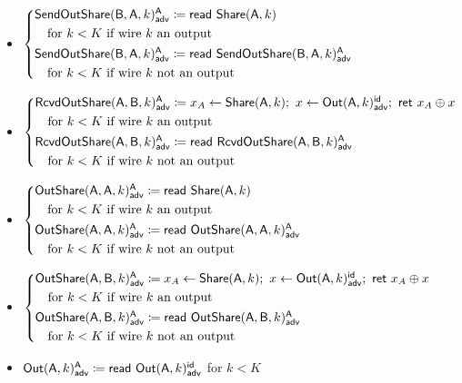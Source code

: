 \begin{itemize}
\item {\color{blue} $\begin{cases*} \LeakSendOutShare(\B,\A,k)^\A_\adv \coloneqq \read{\Share(\A,k)} \\ \hspace{10pt} \text{for $k < K$ if wire $k$ an output} \\ \LeakSendOutShare(\B,\A,k)^\A_\adv \coloneqq \read{\LeakSendOutShare(\B,\A,k)^\A_\adv} \\ \hspace{10pt} \text{for $k < K$ if wire $k$ not an output} \end{cases*}$}
\item {\color{blue} $\begin{cases*} \LeakRcvdOutShare(\A,\B,k)^\A_\adv \coloneqq x_A \leftarrow \Share(\A,k); \ x \leftarrow \LeakOut(\A,k)^\id_\adv; \ \ret{x_A \oplus x} \\ \hspace{10pt} \text{for $k < K$ if wire $k$ an output} \\ \LeakRcvdOutShare(\A,\B,k)^\A_\adv \coloneqq \read{\LeakRcvdOutShare(\A,\B,k)^\A_\adv} \\ \hspace{10pt} \text{for $k < K$ if wire $k$ not an output} \end{cases*}$}
\item {\color{blue} $\begin{cases*} \LeakOutShare(\A,\A,k)^\A_\adv \coloneqq \read{\Share(\A,k)} \\ \hspace{10pt} \text{for $k < K$ if wire $k$ an output} \\ \LeakOutShare(\A,\A,k)^\A_\adv \coloneqq \read{\LeakOutShare(\A,\A,k)^\A_\adv} \\ \hspace{10pt} \text{for $k < K$ if wire $k$ not an output} \end{cases*}$}
\item {\color{blue} $\begin{cases*} \LeakOutShare(\A,\B,k)^\A_\adv \coloneqq x_A \leftarrow \Share(\A,k); \ x \leftarrow \LeakOut(\A,k)^\id_\adv; \ \ret{x_A \oplus x} \\ \hspace{10pt} \text{for $k < K$ if wire $k$ an output} \\ \LeakOutShare(\A,\B,k)^\A_\adv \coloneqq \read{\LeakOutShare(\A,\B,k)^\A_\adv} \\ \hspace{10pt} \text{for $k < K$ if wire $k$ not an output} \end{cases*}$}
\item {\color{blue} $\mathsf{Out}(\mathsf{A},k)^{\mathsf{A}}_{\mathsf{adv}} \coloneqq \mathsf{read} \ \mathsf{Out}(\mathsf{A},k)^{\mathsf{id}}_{\mathsf{adv}}$ for $k < K$}
\end{itemize}

